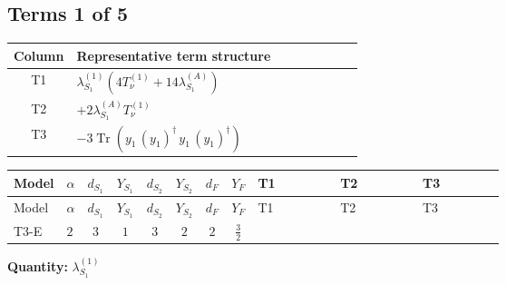 \documentclass[8pt]{article}
\begin{document}
\begin{landscape}
\subsection*{Terms 1 of 5}
\begin{center}
\begin{tabular}{@{}c >{\raggedright\arraybackslash}p{0.82\linewidth}@{}}
\toprule
Column & Representative term structure \\
\midrule
T1 & \(\displaystyle {\lambda_{S_1}^{(1)}} (4 T_{\nu}^{(1)}+14 {\lambda_{S_1}^{(A)}})\) \\
\midrule
T2 & \(\displaystyle +2 {\lambda_{S_1}^{(A)}} T_{\nu}^{(1)}\) \\
\midrule
T3 & \(\displaystyle -3 \operatorname{Tr}\!\left({y_1}\,\left({y_1}\right)^{\dagger}\,{y_1}\,\left({y_1}\right)^{\dagger}\right)\) \\
\midrule
\bottomrule
\end{tabular}
\end{center}
\smallskip
\tiny
\begin{longtable}{@{}llcccccc >{\raggedright\arraybackslash}p{0.21\linewidth} >{\raggedright\arraybackslash}p{0.21\linewidth} >{\raggedright\arraybackslash}p{0.21\linewidth}@{}}
\toprule
Model & $\alpha$ & $d_{S_1}$ & $Y_{S_1}$ & $d_{S_2}$ & $Y_{S_2}$ & $d_F$ & $Y_F$ & T1 & T2 & T3 \\
\midrule
\endfirsthead
\toprule
Model & $\alpha$ & $d_{S_1}$ & $Y_{S_1}$ & $d_{S_2}$ & $Y_{S_2}$ & $d_F$ & $Y_F$ & T1 & T2 & T3 \\
\midrule
\endhead
T3-E & $2$ & $3$ & $1$ & $3$ & $2$ & $2$ & $\frac{3}{2}$ & \scriptsize\adjustbox{max width=\linewidth}{$\begin{gathered} {\lambda_{S_1}^{(1)}} (4 T_{\nu}^{(1)}+14 {\lambda_{S_1}^{(A)}})\end{gathered}$} & \scriptsize\adjustbox{max width=\linewidth}{$\begin{gathered} +2 {\lambda_{S_1}^{(A)}} T_{\nu}^{(1)}\end{gathered}$} & \scriptsize\adjustbox{max width=\linewidth}{$\begin{gathered} -3 \operatorname{Tr}\!\left({y_1}\,\left({y_1}\right)^{\dagger}\,{y_1}\,\left({y_1}\right)^{\dagger}\right)\end{gathered}$} \\
\midrule
\bottomrule
\end{longtable}
\clearpage
\noindent\textbf{Quantity: }$\lambda_{S_1}^{(1)}$\par\smallskip

\end{landscape}
\end{document}

